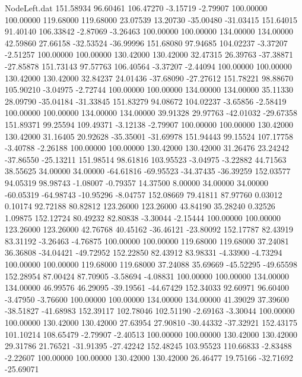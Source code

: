 \begin{filecontents}{NodeLeft.dat}
 151.58934   96.60461  106.47270    -3.15719   -2.79907  100.00000  100.00000  119.68000  119.68000   23.07539   13.20730  -35.00480  -31.03415
 151.64015   91.40140  106.33842    -2.87069   -3.26463  100.00000  100.00000  134.00000  134.00000   42.59860   27.66158  -32.53524  -36.99996
 151.68080   97.94685  104.02237    -3.37207   -2.51257  100.00000  100.00000  130.42000  130.42000   32.47315   26.39763  -37.38871  -27.85878
 151.73143   97.57763  106.40564    -3.37207   -2.44094  100.00000  100.00000  130.42000  130.42000   32.84237   24.01436  -37.68090  -27.27612
 151.78221   98.88670  105.90210    -3.04975   -2.72744  100.00000  100.00000  134.00000  134.00000   35.11330   28.09790  -35.04184  -31.33845
 151.83279   94.08672  104.02237    -3.65856   -2.58419  100.00000  100.00000  134.00000  134.00000   39.91328   29.97763  -42.01032  -29.67358
 151.89371   99.25594  109.49371    -3.12138   -2.79907  100.00000  100.00000  130.42000  130.42000   31.16405   20.92628  -35.35001  -31.69978
 151.94443   99.15524  107.17758    -3.40788   -2.26188  100.00000  100.00000  130.42000  130.42000   31.26476   23.24242  -37.86550  -25.13211
 151.98514   98.61816  103.95523    -3.04975   -3.22882   44.71563   38.55625   34.00000   34.00000  -64.61816  -69.95523  -34.37435  -36.39259
 152.03577   94.05319   98.98743    -1.08007   -0.79357   14.37500    8.00000   34.00000   34.00000  -60.05319  -64.98743  -10.95296   -8.04757
 152.08669   79.41811   87.97760     0.03012    0.10174   92.72188   80.82812  123.26000  123.26000   43.84190   35.28240    0.32526    1.09875
 152.12724   80.49232   82.80838    -3.30044   -2.15444  100.00000  100.00000  123.26000  123.26000   42.76768   40.45162  -36.46121  -23.80092
 152.17787   82.43919   83.31192    -3.26463   -4.76875  100.00000  100.00000  119.68000  119.68000   37.24081   36.36808  -34.04421  -49.72952
 152.22850   82.43912   83.98331    -4.33900   -4.73294  100.00000  100.00000  119.68000  119.68000   37.24088   35.69669  -45.52295  -49.65598
 152.28954   87.00424   87.70905    -3.58694   -4.08831  100.00000  100.00000  134.00000  134.00000   46.99576   46.29095  -39.19561  -44.67429
 152.34033   92.60971   96.60400    -3.47950   -3.76600  100.00000  100.00000  134.00000  134.00000   41.39029   37.39600  -38.51827  -41.68983
 152.39117  102.78046  102.51190    -2.69163   -3.30044  100.00000  100.00000  130.42000  130.42000   27.63954   27.90810  -30.44332  -37.32921
 152.43175  101.10214  108.65479    -2.79907   -2.40513  100.00000  100.00000  130.42000  130.42000   29.31786   21.76521  -31.91395  -27.42242
 152.48245  103.95523  110.66833    -2.83488   -2.22607  100.00000  100.00000  130.42000  130.42000   26.46477   19.75166  -32.71692  -25.69071

\end{filecontents}
